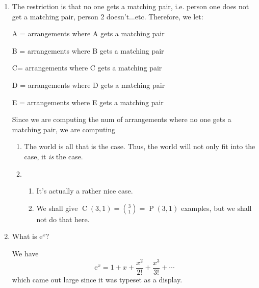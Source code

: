 \documentclass[12pt]{amsart}
\DeclareMathOperator{\perm}{P}
\DeclareMathOperator{\comb}{C}
\newcommand{\e}{\mathrm{e}}
\begin{document}
\begin{enumerate}
\item \smallskip
The restriction is that no one gets a matching pair, i.e. person one does not get a matching pair, person 2 doesn't...etc. Therefore, we let:
\smallskip

A = arrangements where A gets a matching pair 
\smallskip

B = arrangements where B gets a matching pair 
\smallskip

C= arrangements where C gets a matching pair 
\smallskip

D = arrangements where  D gets a matching pair 
\smallskip

E = arrangements where E gets a matching pair 
\smallskip


Since we are computing the num of arrangements where no one gets a matching pair, we are computing 

\bigskip

  \begin{enumerate}
  \item   The world is all that is the case.  Thus, the world will not
    only fit into the case, it \emph{is} the case.
  \item
    \begin{enumerate}
    \item It's actually a rather nice case.
    \item We shall give $\comb(3,1) = \binom{3}{1} = \perm(3,1)$
      examples, but we shall not do that here.
    \end{enumerate}
  \end{enumerate}

\item What is $\e^{x}?$

\bigskip

We have
\begin{displaymath}
  \e^{x} = 1 + x + \frac{x^{2}}{2!} + \frac{x^{3}}{3!} + \cdots
\end{displaymath}
which came out large since it was typeset as a display.

\end{enumerate}
\end{document}
